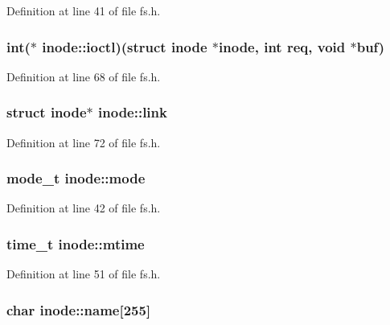 Definition at line 41 of file fs.\+h.

\hypertarget{structinode_a636843da203574bc338b016758bf8c7e}{
\subsubsection[{ioctl}]{\setlength{\rightskip}{0pt plus 5cm}int($\ast$ inode\+::ioctl)(struct {\bf inode} $\ast${\bf inode}, int req, void $\ast$buf)}}\label{structinode_a636843da203574bc338b016758bf8c7e}


Definition at line 68 of file fs.\+h.

\hypertarget{structinode_a3533c53c5391601c66b3ae0f389c0843}{
\subsubsection[{link}]{\setlength{\rightskip}{0pt plus 5cm}struct {\bf inode}$\ast$ inode\+::link}}\label{structinode_a3533c53c5391601c66b3ae0f389c0843}


Definition at line 72 of file fs.\+h.

\hypertarget{structinode_a4902d9f6a1d7bd79c6f1bb73d83ce8e3}{
\subsubsection[{mode}]{\setlength{\rightskip}{0pt plus 5cm}mode\+\_\+t inode\+::mode}}\label{structinode_a4902d9f6a1d7bd79c6f1bb73d83ce8e3}


Definition at line 42 of file fs.\+h.

\hypertarget{structinode_a19f0d407fa2962c942e406d3e00c1da4}{
\subsubsection[{mtime}]{\setlength{\rightskip}{0pt plus 5cm}time\+\_\+t inode\+::mtime}}\label{structinode_a19f0d407fa2962c942e406d3e00c1da4}


Definition at line 51 of file fs.\+h.

\hypertarget{structinode_ad64802d9d4ebdd1c56af5ab6e302faf0}{
\subsubsection[{name}]{\setlength{\rightskip}{0pt plus 5cm}char inode\+::name\mbox{[}255\mbox{]}}}\label{structinode_ad64802d9d4ebdd1c56af5ab6e302faf0}


